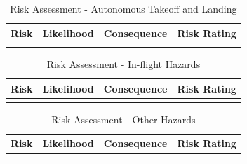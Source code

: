 \begin{table}[!h]
	\label{tab:risks-autonomy}
	\centering
	\begin{tabularx}{\textwidth}{|c|Y|Y|Y|}
		\hline
		\textbf{Risk} & \textbf{Likelihood} & \textbf{Consequence} & \textbf{Risk Rating}\\
		\hline
		& & & \\
		\hline
	\end{tabularx} 
	\caption{Risk Assessment - Autonomous Takeoff and Landing}
\end{table}

\begin{table}[!h]
	\label{tab:risks-inflight}
	\centering
	\begin{tabularx}{\textwidth}{|c|Y|Y|Y|}
		\hline
		\textbf{Risk} & \textbf{Likelihood} & \textbf{Consequence} & \textbf{Risk Rating}\\
		\hline
		& & & \\
		\hline
	\end{tabularx} 
	\caption{Risk Assessment - In-flight Hazards}
\end{table}

\begin{table}[!h]
	\label{tab:risks-other}
	\centering
	\begin{tabularx}{\textwidth}{|c|Y|Y|Y|}
		\hline
		\textbf{Risk} & \textbf{Likelihood} & \textbf{Consequence} & \textbf{Risk Rating}\\
		\hline
		& & & \\
		\hline
	\end{tabularx} 
	\caption{Risk Assessment - Other Hazards}
\end{table}